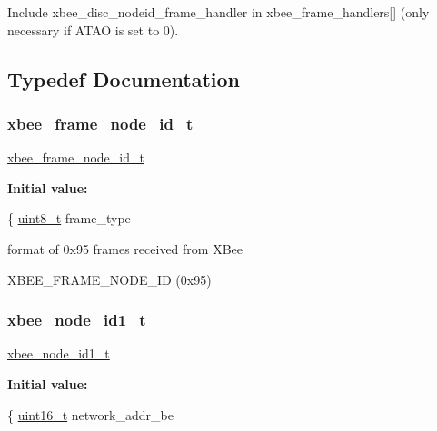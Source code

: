 Include xbee\+\_\+disc\+\_\+nodeid\+\_\+frame\+\_\+handler in xbee\+\_\+frame\+\_\+handlers\mbox{[}\mbox{]} (only necessary if A\+T\+AO is set to 0). 



\subsection{Typedef Documentation}
\mbox{\label{group__xbee__discovery_ga6343d5dfdcee86d1d294b1bafb8d6f23}} 
\subsubsection{\texorpdfstring{xbee\+\_\+frame\+\_\+node\+\_\+id\+\_\+t}{xbee\_frame\_node\_id\_t}}
{\footnotesize\ttfamily \hyperlink{group__xbee__discovery_ga6343d5dfdcee86d1d294b1bafb8d6f23}{xbee\+\_\+frame\+\_\+node\+\_\+id\+\_\+t}}

{\bfseries Initial value\+:}
\begin{DoxyCode}
\{
   \hyperlink{group__hal__dos_gae1affc9ca37cfb624959c866a73f83c2}{uint8\_t}          frame\_type
\end{DoxyCode}


format of 0x95 frames received from X\+Bee 

X\+B\+E\+E\+\_\+\+F\+R\+A\+M\+E\+\_\+\+N\+O\+D\+E\+\_\+\+ID (0x95) \mbox{\label{group__xbee__discovery_gaf00a7a98eff47e084bf5f8741bf41220}} 
\subsubsection{\texorpdfstring{xbee\+\_\+node\+\_\+id1\+\_\+t}{xbee\_node\_id1\_t}}
{\footnotesize\ttfamily \hyperlink{group__xbee__discovery_gaf00a7a98eff47e084bf5f8741bf41220}{xbee\+\_\+node\+\_\+id1\+\_\+t}}

{\bfseries Initial value\+:}
\begin{DoxyCode}
\{
   \hyperlink{group__hal__dos_ga5a8b2dc9e45a9ee81a94ef304fb62505}{uint16\_t}        network\_addr\_be
\end{DoxyCode}


